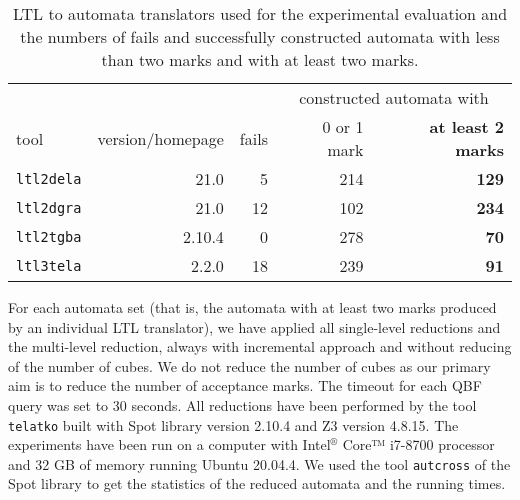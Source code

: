 \documentclass[a4paper,UKenglish,cleveref,autoref,thm-restate]{lipics-v2021}
\newcommand{\todo}[1]{\marginpar{\textcolor{red}{#1}}}
\begin{document}
\begin{table}[t]
  \caption{LTL to automata translators used for the experimental
    evaluation and the numbers of fails and successfully constructed
    automata with less than two marks and with at least two marks.}
\label{tab:ltltranslators}
\centering
%
\begin{tabular}{lrrrr}
  \toprule
  &&& \multicolumn{2}{c}{constructed automata with} \\ \cmidrule(lr){4-5}
  tool &\!\!\!version/homepage & fails & 0 or 1 mark & \textbf{at least 2 marks}\\
  \midrule
  \texttt{ltl2dela} & 21.0\tablefootnote{\label{fn:owl}\url{https://owl.model.in.tum.de/}}
       & 5 & 214 & \textbf{129} \\
  \texttt{ltl2dgra} & 21.0\footnotemark[1]
       & 12 & 102 & \textbf{234}\\
  \texttt{ltl2tgba} & 2.10.4\tablefootnote{\url{https://spot.lrde.epita.fr}}
       & 0 & 278 & \textbf{70}\\
  \texttt{ltl3tela} & 2.2.0\tablefootnote{\url{https://github.com/jurajmajor/ltl3tela}}
       & 18 & 239 & \textbf{91}\\
  \bottomrule
\end{tabular}
\end{table}

For each automata set (that is, the automata with at least two marks
produced by an individual LTL translator), we have applied all
single-level reductions and the multi-level reduction, always with
incremental approach and without reducing of the number of cubes. We
do not reduce the number of cubes as our primary aim is to reduce the
number of acceptance marks.
The timeout for each QBF query was set to 30 seconds.
%
All reductions have been performed by the tool \texttt{telatko}
built with Spot library version 2.10.4 and Z3 version 4.8.15. The
experiments have been run on a computer with Intel$^\text{®}$ Core™ i7-8700
processor and 32 GB of memory running Ubuntu 20.04.4. We used the tool
\texttt{autcross} of the Spot library to get the statistics of the
reduced automata and the running times.
\end{document}
